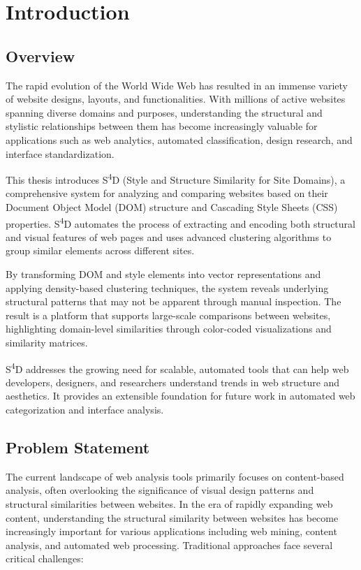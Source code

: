 \chapter{Introduction}
\label{ch:introduction}

\section{Overview}
\label{sec:overview}

The rapid evolution of the World Wide Web has resulted in an immense variety of website designs, layouts, and functionalities. With millions of active websites spanning diverse domains and purposes, understanding the structural and stylistic relationships between them has become increasingly valuable for applications such as web analytics, automated classification, design research, and interface standardization.

This thesis introduces S\textsuperscript{4}D (Style and Structure Similarity for Site Domains), a comprehensive system for analyzing and comparing websites based on their Document Object Model (DOM) structure and Cascading Style Sheets (CSS) properties. S\textsuperscript{4}D automates the process of extracting and encoding both structural and visual features of web pages and uses advanced clustering algorithms to group similar elements across different sites.

By transforming DOM and style elements into vector representations and applying density-based clustering techniques, the system reveals underlying structural patterns that may not be apparent through manual inspection. The result is a platform that supports large-scale comparisons between websites, highlighting domain-level similarities through color-coded visualizations and similarity matrices.

S\textsuperscript{4}D addresses the growing need for scalable, automated tools that can help web developers, designers, and researchers understand trends in web structure and aesthetics. It provides an extensible foundation for future work in automated web categorization and interface analysis.

\section{Problem Statement}
\label{sec:problem-statement}

The current landscape of web analysis tools primarily focuses on content-based analysis, often overlooking the significance of visual design patterns and structural similarities between websites. In the era of rapidly expanding web content, understanding the structural similarity between websites has become increasingly important for various applications including web mining, content analysis, and automated web processing. Traditional approaches face several critical challenges:

